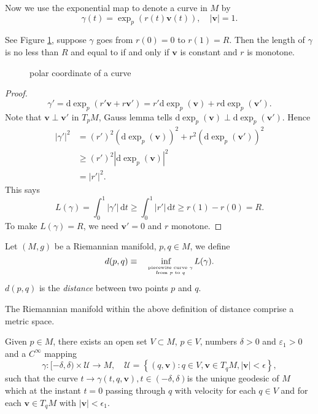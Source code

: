 Now we use the exponential map to denote a curve in  $M$ by 
\[
  \gamma(t)=\exp_p\left( r(t)\mathbf{v}(t) \right), \quad |\mathbf{v}|=1.
\]
\begin{proposition}  
See Figure \ref{fig:polar-coordinate-of-a-curve}, suppose $\gamma$ goes from $r(0)=0$ to $r(1)=R$. Then the length of $\gamma$ is no less than $R$ and equal to if and only if $\mathbf{v}$ is constant and $r$ is monotone. 
\end{proposition}
\begin{figure}[ht]
    \centering
    \caption{polar coordinate of a curve}
    \label{fig:polar-coordinate-of-a-curve}
\end{figure}
\begin{proof}
  \[
    \gamma'=\mathrm{d}\exp_p\left( r'\mathbf{v}+r\mathbf{v}' \right) =r'\mathrm{d}\exp_p(\mathbf{v})+r\mathrm{d}\exp_p(\mathbf{v}').
  \] 
  Note that $\mathbf{v}\perp \mathbf{v}'$ in $T_pM$, Gauss lemma tells $\mathrm{d}\exp_p(\mathbf{v})\perp \mathrm{d}\exp_p\left( \mathbf{v}' \right) $. Hence 
  \begin{align*}
    |\gamma'|^2&=(r')^2\left( \mathrm{d}\exp_p(\mathbf{v}) \right) ^2+r^2\left( \mathrm{d}\exp_p(\mathbf{v}') \right) ^2\\
    &\ge (r')^2|\mathrm{d}\exp_p(\mathbf{v})|^2\\
    &=|r'|^2
  .\end{align*}
This says
\[
  L(\gamma)=\int_0^{1}|\gamma'|\,\mathrm{d}t\ge \int_0^{1}|r'|\,\mathrm{d}t\ge r(1)-r(0)=R.
\]
To make $L(\gamma)=R$, we need $\mathbf{v}'=0$ and $r$ monotone.
\end{proof}

\begin{definition}
  Let $(M,g)$ be a Riemannian manifold, $p,q\in M$, we define 
  \[
    {d}(p,q)\equiv \inf_{\tiny \begin{matrix}
      &\text{piecewise curve }\gamma\\
      & \text{from }p \text{ to }q
  \end{matrix}}L(\gamma).
  \] 
  ${d}(p,q)$ is the \textit{distance}  between two points $p$ and $q$.
\end{definition}
The Riemannian manifold within the above definition of distance comprise a metric space.

\begin{proposition}
  Given $p\in M$, there exists an open set $V\subset  M$, $p\in V$, numbers $\delta>0$ and $\varepsilon _1>0$ and a $C^{\infty}$ mapping
  \[
    \gamma:[-\delta,\delta)\times \mathcal{U}\to M,\quad \mathcal{U}=\left\{(q,\mathbf{v}):q\in V,\mathbf{v}\in T_q M,|\mathbf{v}|<\epsilon \right\},
  \] 
  such that the curve $t\to \gamma(t,q,\mathbf{v}),t\in(-\delta,\delta)$is the unique geodesic of $M$ which at the instant $t=0$ passing through $q$ with velocity for each $q\in V$ and for each $\mathbf{v}\in T_q M$ with $|\mathbf{v}|<\epsilon_1 $.
\end{proposition}

